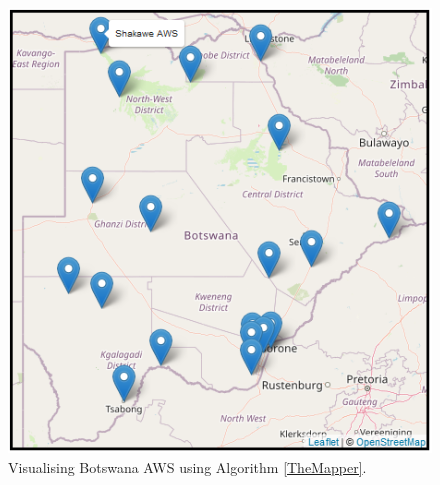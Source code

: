 \documentclass[a4paper, 10pt, conference]{ieeeconf}      %
\begin{document}
\begin{figure}[h]
	\centering
	\includegraphics[width=1\linewidth, height=0.28\textheight]{fig/bw_AWS}
	\caption{Visualising Botswana AWS using  Algorithm \ref{TheMapper}.  
}
	\label{BW_Map}
\end{figure}
\end{document}
